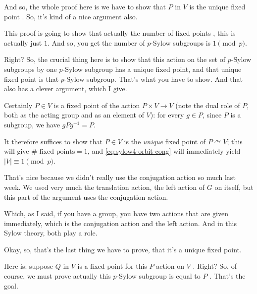\begin{proofWrapper}
\begin{speech}[00:07:01 - 00:08:40]
And so, the whole proof here is we have to show that $P$ in $V$ is the unique fixed point . So, it's kind of a nice argument also.

This proof is going to show that actually the number of fixed points , this is actually just $1$. And so, you get the number of $p$-Sylow subgroups is $1 \pmod p$.

Right? So, the crucial thing here is to show that this action on the set of $p$-Sylow subgroups by one $p$-Sylow subgroup has a unique fixed point, and that unique fixed point is that $p$-Sylow subgroup. That's what you have to show. And that also has a clever argument, which I give.
\end{speech}

\begin{content}
Certainly $P \in V$ is a fixed point of the action $P \times V \to V$ (note the dual role of $P$, both as the acting group and as an element of $V$): for every $g \in P$, since $P$ is a subgroup, we have $g P g^{-1} = P$.

It therefore suffices to show that $P \in V$ is the \emph{unique} fixed point of $P \curvearrowright V$; this will give $\#\text{ fixed points} = 1$, and \eqref{eq:sylow4-orbit-cong} will immediately yield $|V| \equiv 1 \pmod p$.
\end{content}

\begin{speech}[00:09:00 - 00:09:49]
That's nice because we didn't really use the conjugation action so much last week. We used very much the translation action, the left action of $G$ on itself, but this part of the argument uses the conjugation action.

Which, as I said, if you have a group, you have two actions that are given immediately, which is the conjugation action and the left action. And in this Sylow theory, both play a role. 
\end{speech}

\begin{speech}[00:09:49 - 00:10:21]
Okay, so, that's the last thing we have to prove, that it's a unique fixed point.

Here is: suppose $Q$ in $V$ is a fixed point for this $P$-action on $V$ . Right? So, of course, we must prove actually this $p$-Sylow subgroup is equal to $P$ . That's the goal.
\end{speech}


\end{proofWrapper}
